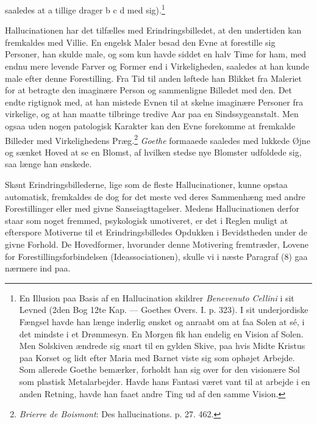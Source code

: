 \documentclass[12pt,a4paper,openany]{book}
\newcommand{\opage}[1]{\marginnote{\footnotesize\textit{[#1]}}}
\begin{document}
saaledes at a tillige drager b c d med sig).\footnote[1]{En Illusion paa
Basis af en Hallucination skildrer \emph{Benevenuto Cellini} i sit
Levned (2den Bog 12te Kap. --- Goethes Overs. I. p. 323). I sit
underjordiske Fængsel havde han længe inderlig ønsket og anraabt om at
faa Solen at sé, i det mindste i et Drømmesyn. En Morgen fik han endelig
en Vision af Solen. Men Solskiven ændrede sig snart til en gylden Skive,
paa hvis Midte Kristus paa Korset og lidt efter Maria med Barnet viste
sig som ophøjet Arbejde. Som allerede Goethe bemærker, forholdt han sig
over for den visionære Sol som plastisk Metalarbejder. Havde hans
Fantasi været vant til at arbejde i en anden Retning, havde han faaet
andre Ting ud af den samme Vision.}

Hallucinationen har det tilfælles med Erindringsbilledet, at den
undertiden kan fremkaldes med Villie. En engelsk Maler besad den Evne at
forestille sig Personer, han skulde male, og som kun havde siddet en
halv Time for ham, med endnu mere levende Farver og Former end i
Virkeligheden, saaledes at han kunde male efter denne Forestilling. Fra
Tid til anden løftede han Blikket fra Maleriet for at betragte den
imaginære Person og sammenligne Billedet med den. Det endte rigtignok
med, at han mistede Evnen til at skelne imaginære Personer fra
virkelige, og at han maatte tilbringe tredive Aar paa en
Sindssygeanstalt. Men ogsaa uden nogen patologisk Karakter kan den Evne
forekomme at fremkalde Billeder med Virkelighedens
Præg.\footnote[2]{\emph{Brierre de Boismont}: Des hallucinations. p. 27.
462.} \emph{Goethe} formaaede saaledes med lukkede
\opage{178}Øjne og sænket Hoved at se en Blomst, af hvilken stedse nye
Blomster udfoldede sig, saa længe han ønskede.

Skønt Erindringsbillederne, lige som de fleste Hallucinationer, kunne
opstaa automatisk, fremkaldes de dog for det meste ved deres Sammenhæng
med andre Forestillinger eller med givne Sanseiagttagelser. Medens
Hallucinationen derfor staar som noget fremmed, psykologisk umotiveret,
er det i Reglen muligt at efterspore Motiverne til et Erindringsbilledes
Opdukken i Bevidstheden under de givne Forhold. De Hovedformer,
hvorunder denne Motivering fremtræder, Lovene for
Forestillingsforbindelsen (Ideassociationen), skulle vi i næste Paragraf
(8) gaa nærmere ind paa.
\end{document}
